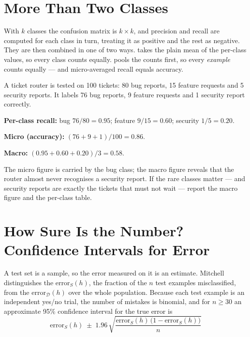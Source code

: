 \section{More Than Two Classes}

With $k$ classes the confusion matrix is $k \times k$, and precision and recall
are computed for each class in turn, treating it as positive and the rest as
negative. They are then combined in one of two ways.  takes
the plain mean of the per-class values, so every class counts equally.
 pools the counts first, so every \emph{example} counts
equally --- and micro-averaged recall equals accuracy.

\begin{worked}
A ticket router is tested on 100 tickets: 80 bug reports, 15 feature requests and
5 security reports. It labels 76 bug reports, 9 feature requests and 1 security
report correctly.

\smallskip
\textbf{Per-class recall:} bug $76/80 = 0.95$; feature $9/15 = 0.60$;
security $1/5 = 0.20$.

\textbf{Micro (accuracy):} $(76 + 9 + 1)/100 = \mathbf{0.86}$.

\textbf{Macro:} $(0.95 + 0.60 + 0.20)/3 = \mathbf{0.58}$.

\smallskip
The micro figure is carried by the bug class; the macro figure reveals that the
router almost never recognises a security report. If the rare classes matter ---
and security reports are exactly the tickets that must not wait --- report the
macro figure and the per-class table.
\end{worked}

\section{How Sure Is the Number? Confidence Intervals for Error}

A test set is a sample, so the error measured on it is an estimate. Mitchell
distinguishes the  $\text{error}_S(h)$, the fraction of the $n$
test examples misclassified, from the  $\text{error}_{\mathcal{D}}(h)$
over the whole population. Because each test example is an independent yes/no
trial, the number of mistakes is binomial, and for $n \ge 30$ an approximate 95\%
confidence interval for the true error is
\[
\text{error}_S(h) \;\pm\; 1.96\,\sqrt{\frac{\text{error}_S(h)\,\big(1 - \text{error}_S(h)\big)}{n}}
\]

